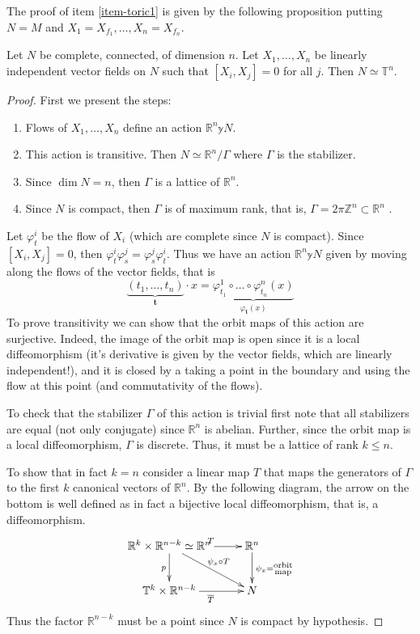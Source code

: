 The proof of item \ref{item-toric1} is given by
the following proposition
putting $N=M$ and $X_1=X_{f_1},\ldots,X_n=X_{f_n}$.

\begin{proposition}
\label{proposition-torus}
Let $N$ be complete, connected, of dimension $n$.
Let $X_1,\ldots,X_n$ be linearly independent vector fields on $N$ 
such that $[X_i,X_j]=0$ for all $j$.
Then $N \simeq \mathbb{T}^n$.
\end{proposition}

\begin{proof}
First we present the steps:
\begin{enumerate}
\item Flows of $X_1,\ldots,X_n$ define an action $\mathbb{R}^n \mathbb{y} N$.

\item This action is transitive. Then $N \simeq \mathbb{R}^n/\Gamma$
where $\Gamma$ is the stabilizer.

\item Since $\dim N=n$, then  $\Gamma$ is a lattice of $\mathbb{R}^n$.

\item Since $N$ is compact, then $\Gamma$ is of maximum rank, that is,
$\Gamma=2\pi \mathbb{Z}^n \subset \mathbb{R}^n$ .
\end{enumerate}


Let $\varphi^i_t$ be the flow of $X_i$ (which are complete since $N$ is
compact).
Since $[X_i,X_j]=0$, then $\varphi_t^i \varphi_s^j=\varphi_s^j \varphi^i_t$.
Thus we have an action $\mathbb{R}^n\mathbb{y} N$
given by moving along the flows of the vector fields, that is
$$
\underbrace{(t_1,\ldots,t_n)}_{\mathbf{t}}\cdot x
=\underbrace{\varphi_{t_1}^1 \circ \ldots \circ \varphi_{t_n}^n(x)}_{
\varphi_{\mathbf{t}}(x)}
$$
To prove transitivity 
we can show that the orbit maps of this action are surjective.
Indeed, the image of the orbit map is open since it is a local
diffeomorphism (it's derivative is given by the vector fields,
which are linearly independent!),
and it is closed by a taking a point in the boundary and 
using the flow at this point (and commutativity of the flows).

To check that the stabilizer $\Gamma$ of this action is trivial
first note that all stabilizers are equal
(not only conjugate) since $\mathbb{R}^n$ is abelian.
Further, since the orbit map is a local diffeomorphism,
$\Gamma$ is discrete. Thus, it must be a lattice of rank $k \leq n$.

To show that in fact $k=n$ consider a linear map  $T$ 
that maps the generators of $\Gamma$ to the first $k$ canonical 
vectors of $\mathbb{R}^n$. By the following diagram, the arrow on the bottom
is well defined as in fact a bijective local diffeomorphism,
that is, a diffeomorphism.
$$
\xymatrix{
\mathbb{R}^k \times\mathbb{R}^{n-k} \simeq \mathbb{R}^n\ar[r]^{T}\ar[d]_{p}
\ar[dr]^{\psi_x \circ T}&
\mathbb{R}^n\ar[d]^{\psi_x=\substack{\text{orbit} \\ \text{map}}}\\
\mathbb{T}^k \times \mathbb{R}^{n-k}\ar[r]_{\overline{T}}&
N
}
$$
Thus the factor $\mathbb{R}^{n-k}$ must be a point since $N$ is
compact by hypothesis.
\end{proof}

